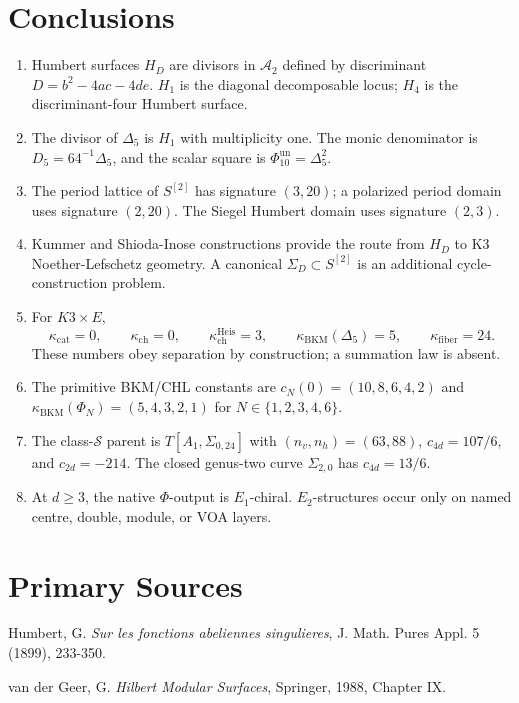 \documentclass[11pt]{article}
\providecommand{\cA}{\mathcal{A}}
\providecommand{\cS}{\mathcal{S}}
\providecommand{\kBKM}{\kappa_{\mathrm{BKM}}}
\providecommand{\kcat}{\kappa_{\mathrm{cat}}}
\providecommand{\kch}{\kappa_{\mathrm{ch}}}
\providecommand{\kHeis}{\kappa_{\mathrm{ch}}^{\mathrm{Heis}}}
\providecommand{\kfib}{\kappa_{\mathrm{fiber}}}
\providecommand{\Dfive}{\Delta_5}
\providecommand{\PhiTen}{\Phi_{10}}
\begin{document}
\section{Conclusions}

\begin{enumerate}[leftmargin=1.7em]
  \item Humbert surfaces \(H_D\) are divisors in \(\cA_2\) defined by
  discriminant \(D=b^2-4ac-4de\).  \(H_1\) is the diagonal decomposable
  locus; \(H_4\) is the discriminant-four Humbert surface.
  \item The divisor of \(\Dfive\) is \(H_1\) with multiplicity one.
  The monic denominator is \(D_5=64^{-1}\Dfive\), and the scalar square
  is \(\PhiTen^{\mathrm{un}}=\Dfive^2\).
  \item The period lattice of \(S^{[2]}\) has signature \((3,20)\);
  a polarized period domain uses signature \((2,20)\).  The Siegel
  Humbert domain uses signature \((2,3)\).
  \item Kummer and Shioda-Inose constructions provide the route from
  \(H_D\) to K3 Noether-Lefschetz geometry.  A canonical
  \(\Sigma_D\subset S^{[2]}\) is an additional cycle-construction
  problem.
  \item For \(K3\times E\),
  \[
    \kcat=0,\qquad
    \kch=0,\qquad
    \kHeis=3,\qquad
    \kBKM(\Dfive)=5,\qquad
    \kfib=24.
  \]
  These numbers obey separation by construction; a summation law is
  absent.
  \item The primitive BKM/CHL constants are
  \(c_N(0)=(10,8,6,4,2)\) and
  \(\kBKM(\Phi_N)=(5,4,3,2,1)\) for
  \(N\in\{1,2,3,4,6\}\).
  \item The class-\(\cS\) parent is
  \(T[A_1,\Sigma_{0,24}]\) with
  \((n_v,n_h)=(63,88)\), \(c_{4d}=107/6\), and \(c_{2d}=-214\).
  The closed genus-two curve \(\Sigma_{2,0}\) has \(c_{4d}=13/6\).
  \item At \(d\geq3\), the native \(\Phi\)-output is \(E_1\)-chiral.
  \(E_2\)-structures occur only on named centre, double, module, or VOA
  layers.
\end{enumerate}

\section{Primary Sources}

Humbert, G.  \emph{Sur les fonctions abeliennes singulieres},
J. Math. Pures Appl. 5 (1899), 233-350.

van der Geer, G.  \emph{Hilbert Modular Surfaces}, Springer, 1988,
Chapter IX.
\end{document}
